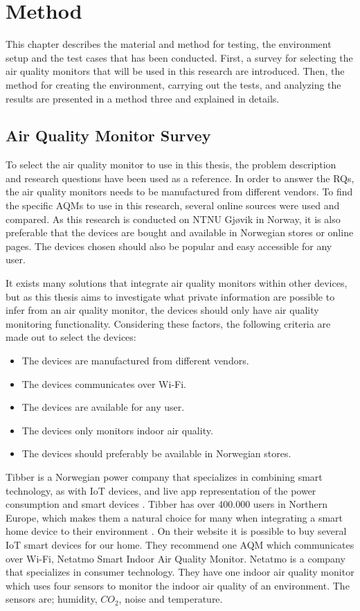 \chapter{Method}
This chapter describes the material and method for testing, the environment setup and the test cases that has been conducted. First, a survey for selecting the air quality monitors that will be used in this research are introduced. Then, the method for creating the environment, carrying out the tests, and analyzing the results are presented in a method three and explained in details.  

\section{Air Quality Monitor Survey}
To select the air quality monitor to use in this thesis, the problem description and research questions have been used as a reference. In order to answer the RQs, the air quality monitors needs to be manufactured from different vendors. To find the specific \gls{AQM}s to use in this research, several online sources were used and compared. As this research is conducted on NTNU Gjøvik in Norway, it is also preferable that the devices are bought and available in Norwegian stores or online pages. The devices chosen should also be popular and easy accessible for any user. 

It exists many solutions that integrate air quality monitors within other devices, but as this thesis aims to investigate what private information are possible to infer from an air quality monitor, the devices should only have air quality monitoring functionality.  Considering these factors, the following criteria are made out to select the devices:
\begin{itemize}
    \item The devices are manufactured from different vendors.
    \item The devices communicates over \gls{Wi-Fi}.
    \item The devices are available for any user.
    \item The devices only monitors indoor air quality.
    \item The devices should preferably be available in Norwegian stores.
\end{itemize}
Tibber \cite{Tibber} is a Norwegian power company that specializes in combining smart technology, as with \gls{IoT} devices, and live app representation of the power consumption and smart devices \cite{Tibber}.  Tibber has over 400.000 users in Northern Europe, which makes them a natural choice for many when integrating a smart home device to their environment \cite{TibberUsers}. On their website it is possible to buy several \gls{IoT} smart devices for our home. They recommend one \gls{AQM} which communicates over \gls{Wi-Fi}, Netatmo Smart Indoor Air Quality Monitor. Netatmo \cite{Netatmo} is a company that specializes in consumer technology. They have one indoor air quality monitor which uses four sensors to monitor the indoor air quality of an environment. The sensors are; humidity, \(CO_2\), noise and temperature. 


